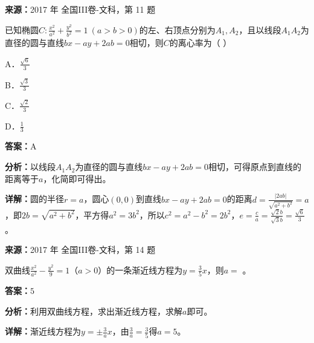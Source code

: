 \begin{question}[points=5]
\textbf{来源：}2017 年 全国III卷-文科，第 11 题\par
已知椭圆$C:\frac{x^2}{a^2}+\frac{y^2}{b^2}=1\ (a>b>0)$的左、右顶点分别为$A_1,A_2$，且以线段$A_1A_2$为直径的圆与直线$bx-ay+2ab=0$相切，则$C$的离心率为（              ）
\begin{choices}
  \item A．$\frac{\sqrt{6}}{3}$
  \item B．$\frac{\sqrt{3}}{3}$
  \item C．$\frac{\sqrt{2}}{3}$
  \item D．$\frac{1}{3}$
\end{choices}
\begin{solution}
\textbf{答案：}A

\textbf{分析：}以线段$A_1A_2$为直径的圆与直线$bx-ay+2ab=0$相切，可得原点到直线的距离等于$a$，化简即可得出。

\textbf{详解：}圆的半径$r=a$，圆心$(0,0)$到直线$bx-ay+2ab=0$的距离$d=\frac{|2ab|}{\sqrt{a^2+b^2}}=a$，即$2b=\sqrt{a^2+b^2}$，平方得$a^2=3b^2$，所以$c^2=a^2-b^2=2b^2$，$e=\frac{c}{a}=\frac{\sqrt{2}b}{\sqrt{3}b}=\frac{\sqrt{6}}{3}$。
\end{solution}
\end{question}

\begin{question}[points=5]
\textbf{来源：}2017 年 全国III卷-文科，第 14 题\par
双曲线$\frac{x^2}{a^2}-\frac{y^2}{9}=1$（$a>0$）的一条渐近线方程为$y=\frac{3}{5}x$，则$a=$              。
\fillin[{$5$}]
\begin{solution}
\textbf{答案：}$5$

\textbf{分析：}利用双曲线方程，求出渐近线方程，求解$a$即可。

\textbf{详解：}渐近线方程为$y=\pm\frac{3}{a}x$，由$\frac{3}{a}=\frac{3}{5}$得$a=5$。
\end{solution}
\end{question}

